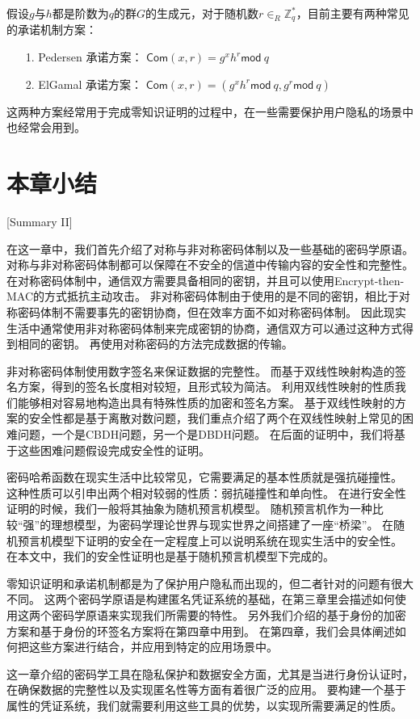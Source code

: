假设$g$与$h$都是阶数为$q$的群$G$的生成元，对于随机数$r\in_R\mathbb{Z}_q^*$，目前主要有两种常见的承诺机制方案：

\begin{itemize}
  \item[1.] Pedersen 承诺方案： $\mathsf{Com}(x,r)=g^xh^r\mathsf{mod}\ q$
  \item[2.] ElGamal 承诺方案： $\mathsf{Com}(x,r)=(g^xh^r \mathsf{mod}\ q,g^r\mathsf{mod}\ q)$
\end{itemize}

这两种方案经常用于完成零知识证明的过程中，在一些需要保护用户隐私的场景中也经常会用到。

\section{本章小结}[Summary II]

在这一章中，我们首先介绍了对称与非对称密码体制以及一些基础的密码学原语。
对称与非对称密码体制都可以保障在不安全的信道中传输内容的安全性和完整性。
在对称密码体制中，通信双方需要具备相同的密钥，并且可以使用Encrypt-then-MAC的方式抵抗主动攻击。
非对称密码体制由于使用的是不同的密钥，相比于对称密码体制不需要事先的密钥协商，但在效率方面不如对称密码体制。
因此现实生活中通常使用非对称密码体制来完成密钥的协商，通信双方可以通过这种方式得到相同的密钥。
再使用对称密码的方法完成数据的传输。

非对称密码体制使用数字签名来保证数据的完整性。
而基于双线性映射构造的签名方案，得到的签名长度相对较短，且形式较为简洁。
利用双线性映射的性质我们能够相对容易地构造出具有特殊性质的加密和签名方案。
基于双线性映射的方案的安全性都是基于离散对数问题，我们重点介绍了两个在双线性映射上常见的困难问题，一个是CBDH问题，另一个是DBDH问题。
在后面的证明中，我们将基于这些困难问题假设完成安全性的证明。

密码哈希函数在现实生活中比较常见，它需要满足的基本性质就是强抗碰撞性。
这种性质可以引申出两个相对较弱的性质：弱抗碰撞性和单向性。
在进行安全性证明的时候，我们一般将其抽象为随机预言机模型。
随机预言机作为一种比较“强”的理想模型，为密码学理论世界与现实世界之间搭建了一座“桥梁”。
在随机预言机模型下证明的安全在一定程度上可以说明系统在现实生活中的安全性。
在本文中，我们的安全性证明也是基于随机预言机模型下完成的。

零知识证明和承诺机制都是为了保护用户隐私而出现的，但二者针对的问题有很大不同。
这两个密码学原语是构建匿名凭证系统的基础，在第三章里会描述如何使用这两个密码学原语来实现我们所需要的特性。
另外我们介绍的基于身份的加密方案和基于身份的环签名方案将在第四章中用到。
在第四章，我们会具体阐述如何把这些方案进行结合，并应用到特定的应用场景中。

这一章介绍的密码学工具在隐私保护和数据安全方面，尤其是当进行身份认证时，在确保数据的完整性以及实现匿名性等方面有着很广泛的应用。
要构建一个基于属性的凭证系统，我们就需要利用这些工具的优势，以实现所需要满足的性质。